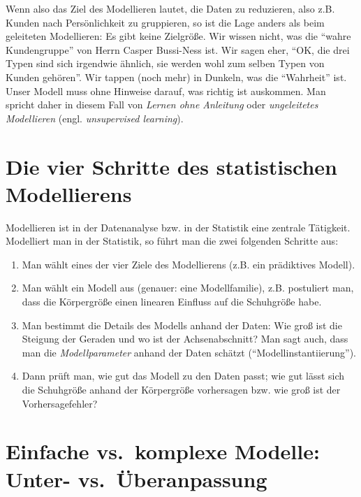 \documentclass[12pt,ngerman,]{book}
\providecommand{\tightlist}{%
  \setlength{\itemsep}{0pt}\setlength{\parskip}{0pt}}
\begin{document}
Wenn also das Ziel des Modellieren lautet, die Daten zu reduzieren, also
z.B. Kunden nach Persönlichkeit zu gruppieren, so ist die Lage anders
als beim geleiteten Modellieren: Es gibt keine Zielgröße. Wir wissen
nicht, was die ``wahre Kundengruppe'' von Herrn Casper Bussi-Ness ist.
Wir sagen eher, ``OK, die drei Typen sind sich irgendwie ähnlich, sie
werden wohl zum selben Typen von Kunden gehören''. Wir tappen (noch
mehr) in Dunkeln, was die ``Wahrheit'' ist. Unser Modell muss ohne
Hinweise darauf, was richtig ist auskommen. Man spricht daher in diesem
Fall von \emph{Lernen ohne Anleitung} oder
\emph{ungeleitetes Modellieren} (engl. \emph{unsupervised
learning}).

\section{Die vier Schritte des statistischen
Modellierens}\label{die-vier-schritte-des-statistischen-modellierens}

Modellieren ist in der Datenanalyse bzw. in der Statistik eine zentrale
Tätigkeit. Modelliert man in der Statistik, so führt man die zwei
folgenden Schritte aus:

\begin{enumerate}
\def\labelenumi{\arabic{enumi}.}
\tightlist
\item
  Man wählt eines der vier Ziele des Modellierens (z.B. ein prädiktives
  Modell).
\item
  Man wählt ein Modell aus (genauer: eine Modellfamilie), z.B.
  postuliert man, dass die Körpergröße einen linearen Einfluss auf die
  Schuhgröße habe.
\item
  Man bestimmt die Details des Modells anhand der Daten: Wie groß ist
  die Steigung der Geraden und wo ist der Achsenabschnitt? Man sagt
  auch, dass man die \emph{Modellparameter} anhand der Daten schätzt
  (``Modellinstantiierung'').
\item
  Dann prüft man, wie gut das Modell zu den Daten passt; wie gut lässt
  sich die Schuhgröße anhand der Körpergröße vorhersagen bzw. wie groß
  ist der Vorhersagefehler?
\end{enumerate}

\section{Einfache vs.~komplexe Modelle: Unter-
vs.~Überanpassung}\label{einfache-vs.komplexe-modelle-unter--vs.uberanpassung}
\end{document}

